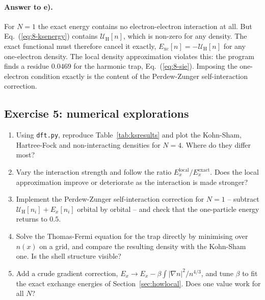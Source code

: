 \paragraph{Answer to e).}
For $N=1$ the exact energy contains no electron-electron interaction at all.
But Eq.~(\ref{eq:8-ksenergy}) contains $\mathcal{U}_{\mathrm{H}}[n]$, which is
non-zero for any density.  The exact functional must therefore cancel it
exactly, $E_{\mathrm{xc}}[n]=-\mathcal{U}_{\mathrm{H}}[n]$ for any one-electron
density.  The local density approximation violates this: the program finds a
residue $0.0469$ for the harmonic trap, Eq.~(\ref{eq:8-sie}).  Imposing the
one-electron condition exactly is the content of the Perdew-Zunger
self-interaction correction.

\subsection*{Exercise 5: numerical explorations}
\label{ex:8-numerical}

\begin{enumerate}
  \item[a)] Using \texttt{dft.py}, reproduce Table~\ref{tab:ksresults} and
  plot the Kohn-Sham, Hartree-Fock and non-interacting densities for $N=4$.
  Where do they differ most?
  \item[b)] Vary the interaction strength and follow the ratio
  $E_x^{\mathrm{local}}/E_x^{\mathrm{exact}}$.  Does the local approximation
  improve or deteriorate as the interaction is made stronger?
  \item[c)] Implement the Perdew-Zunger self-interaction correction for
  $N=1$ -- subtract $\mathcal{U}_{\mathrm{H}}[n_i]+E_x[n_i]$ orbital by
  orbital -- and check that the one-particle energy returns to $0.5$.
  \item[d)] Solve the Thomas-Fermi equation for the trap directly by
  minimising over $n(x)$ on a grid, and compare the resulting density with
  the Kohn-Sham one.  Is the shell structure visible?
  \item[e)] Add a crude gradient correction,
  $E_x\to E_x-\beta\int\vert\nabla n\vert^2/n^{4/3}$, and tune $\beta$ to fit
  the exact exchange energies of Section~\ref{sec:howlocal}.  Does one value
  work for all $N$?
\end{enumerate}

